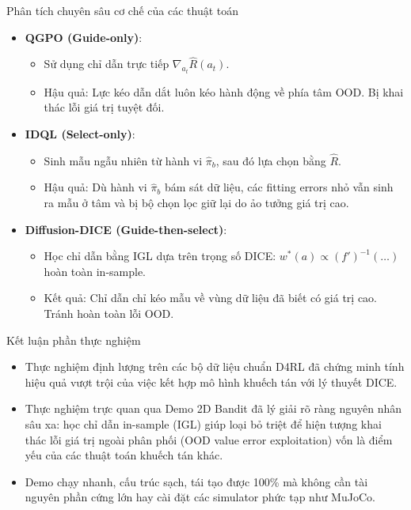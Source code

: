 \begin{frame}{Phân tích chuyên sâu cơ chế của các thuật toán}
    \begin{itemize}
        \item \textbf{QGPO (Guide-only)}:
        \begin{itemize}
            \item Sử dụng chỉ dẫn trực tiếp $\nabla_{a_t} \hat{R}(a_t)$.
            \item Hậu quả: Lực kéo dẫn dắt luôn kéo hành động về phía tâm OOD. Bị khai thác lỗi giá trị tuyệt đối.
        \end{itemize}
        \item \textbf{IDQL (Select-only)}:
        \begin{itemize}
            \item Sinh mẫu ngẫu nhiên từ hành vi $\hat{\pi}_b$, sau đó lựa chọn bằng $\hat{R}$.
            \item Hậu quả: Dù hành vi $\hat{\pi}_b$ bám sát dữ liệu, các fitting errors nhỏ vẫn sinh ra mẫu ở tâm và bị bộ chọn lọc giữ lại do ảo tưởng giá trị cao.
        \end{itemize}
        \item \textbf{Diffusion-DICE (Guide-then-select)}:
        \begin{itemize}
            \item Học chỉ dẫn bằng IGL dựa trên trọng số DICE: $w^*(a) \propto (f')^{-1}(\dots)$ hoàn toàn in-sample.
            \item Kết quả: Chỉ dẫn chỉ kéo mẫu về vùng dữ liệu đã biết có giá trị cao. Tránh hoàn toàn lỗi OOD.
        \end{itemize}
    \end{itemize}
\end{frame}

\begin{frame}{Kết luận phần thực nghiệm}
    \begin{itemize}
        \item Thực nghiệm định lượng trên các bộ dữ liệu chuẩn D4RL đã chứng minh tính hiệu quả vượt trội của việc kết hợp mô hình khuếch tán với lý thuyết DICE.
        \item Thực nghiệm trực quan qua Demo 2D Bandit đã lý giải rõ ràng nguyên nhân sâu xa: học chỉ dẫn in-sample (IGL) giúp loại bỏ triệt để hiện tượng khai thác lỗi giá trị ngoài phân phối (OOD value error exploitation) vốn là điểm yếu của các thuật toán khuếch tán khác.
        \item Demo chạy nhanh, cấu trúc sạch, tái tạo được 100\% mà không cần tài nguyên phần cứng lớn hay cài đặt các simulator phức tạp như MuJoCo.
    \end{itemize}
\end{frame}
